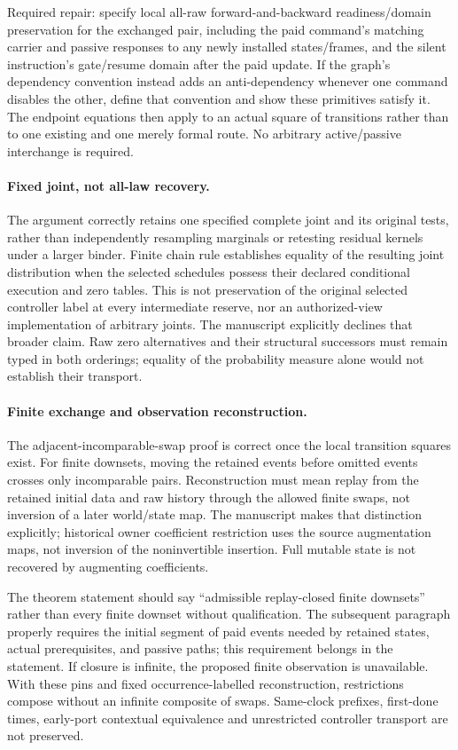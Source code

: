 \documentclass{article}
\begin{document}
Required repair: specify local all-raw forward-and-backward readiness/domain preservation for the exchanged pair, including the paid command's matching carrier and passive responses to any newly installed states/frames, and the silent instruction's gate/resume domain after the paid update. If the graph's dependency convention instead adds an anti-dependency whenever one command disables the other, define that convention and show these primitives satisfy it. The endpoint equations then apply to an actual square of transitions rather than to one existing and one merely formal route. No arbitrary active/passive interchange is required.

\paragraph{Fixed joint, not all-law recovery.}
The argument correctly retains one specified complete joint and its original tests, rather than independently resampling marginals or retesting residual kernels under a larger binder. Finite chain rule establishes equality of the resulting joint distribution when the selected schedules possess their declared conditional execution and zero tables. This is not preservation of the original selected controller label at every intermediate reserve, nor an authorized-view implementation of arbitrary joints. The manuscript explicitly declines that broader claim. Raw zero alternatives and their structural successors must remain typed in both orderings; equality of the probability measure alone would not establish their transport.

\paragraph{Finite exchange and observation reconstruction.}
The adjacent-incomparable-swap proof is correct once the local transition squares exist. For finite downsets, moving the retained events before omitted events crosses only incomparable pairs. Reconstruction must mean replay from the retained initial data and raw history through the allowed finite swaps, not inversion of a later world/state map. The manuscript makes that distinction explicitly; historical owner coefficient restriction uses the source augmentation maps, not inversion of the noninvertible insertion. Full mutable state is not recovered by augmenting coefficients.

The theorem statement should say ``admissible replay-closed finite downsets'' rather than every finite downset without qualification. The subsequent paragraph properly requires the initial segment of paid events needed by retained states, actual prerequisites, and passive paths; this requirement belongs in the statement. If closure is infinite, the proposed finite observation is unavailable. With these pins and fixed occurrence-labelled reconstruction, restrictions compose without an infinite composite of swaps. Same-clock prefixes, first-done times, early-port contextual equivalence and unrestricted controller transport are not preserved.
\end{document}

